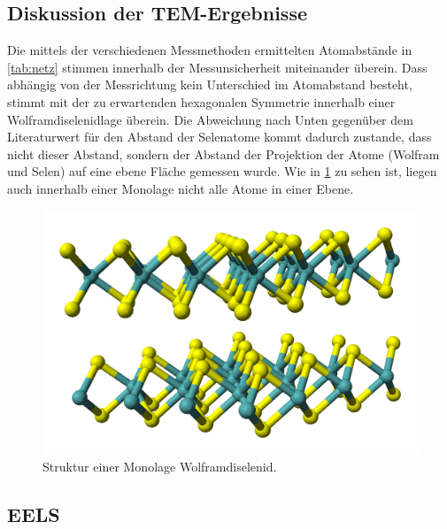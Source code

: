 \subsection{Diskussion der TEM-Ergebnisse}

  Die mittels der verschiedenen Messmethoden ermittelten Atomabstände in \cref{tab:netz} stimmen innerhalb der Messunsicherheit miteinander überein.
  Dass abhängig von der Messrichtung kein Unterschied im Atomabstand besteht, stimmt mit der zu erwartenden hexagonalen Symmetrie innerhalb einer Wolframdiselenidlage überein.
  Die Abweichung nach Unten gegenüber dem Literaturwert für den Abstand der Selenatome kommt dadurch zustande, dass nicht dieser Abstand, sondern der Abstand der Projektion der Atome (Wolfram und Selen) auf eine ebene Fläche gemessen wurde.
  Wie in \cref{fig:strukt} zu sehen ist, liegen auch innerhalb einer Monolage nicht alle Atome in einer Ebene.

	\begin{figure}[H]
  \centering
			\includegraphics[width= 0.4 \linewidth]{img/strukt}
			\caption{
        Struktur einer Monolage Wolframdiselenid. \cite{wiki_wse_bild}
			}
			\label{fig:strukt}
	\end{figure}

  \subsection{EELS}

